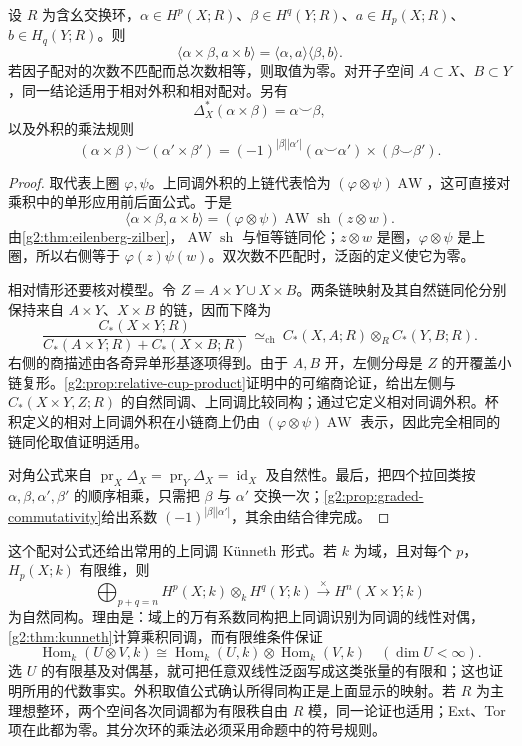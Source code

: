 \begin{proposition}\label{g2:prop:cross-cup-evaluation}
	设 \(R\) 为含幺交换环，\(\alpha\in H^p(X;R)\)、\(\beta\in H^q(Y;R)\)、\(a\in H_p(X;R)\)、\(b\in H_q(Y;R)\)。则
	\[
		\langle\alpha\times\beta,a\times b\rangle
		=\langle\alpha,a\rangle\langle\beta,b\rangle.
	\]
	若因子配对的次数不匹配而总次数相等，则取值为零。对开子空间 \(A\subset X\)、\(B\subset Y\)，同一结论适用于相对外积和相对配对。另有
	\[
		\Delta_X^*(\alpha\times\beta)=\alpha\smile\beta,
	\]
	以及外积的乘法规则
	\[
		(\alpha\times\beta)\smile(\alpha'\times\beta')
		=(-1)^{|\beta||\alpha'|}
			(\alpha\smile\alpha')\times(\beta\smile\beta').
	\]
\end{proposition}
\begin{proof}
	取代表上圈 \(\varphi,\psi\)。上同调外积的上链代表恰为 \((\varphi\otimes\psi)\operatorname{AW}\)，这可直接对乘积中的单形应用前后面公式。于是
	\[
		\langle\alpha\times\beta,a\times b\rangle
		=(\varphi\otimes\psi)\operatorname{AW}\operatorname{sh}(z\otimes w).
	\]
	由\cref{g2:thm:eilenberg-zilber}，\(\operatorname{AW}\operatorname{sh}\) 与恒等链同伦；\(z\otimes w\) 是圈，\(\varphi\otimes\psi\) 是上圈，所以右侧等于 \(\varphi(z)\psi(w)\)。双次数不匹配时，泛函的定义使它为零。

	相对情形还要核对模型。令 \(Z=A\times Y\cup X\times B\)。两条链映射及其自然链同伦分别保持来自 \(A\times Y\)、\(X\times B\) 的链，因而下降为
	\[
		\frac{C_*(X\times Y;R)}{C_*(A\times Y;R)+C_*(X\times B;R)}
		\ \simeq_{\mathrm{ch}}\
		C_*(X,A;R)\otimes_R C_*(Y,B;R).
	\]
	右侧的商描述由各奇异单形基逐项得到。由于 \(A,B\) 开，左侧分母是 \(Z\) 的开覆盖小链复形。\cref{g2:prop:relative-cup-product}证明中的可缩商论证，给出左侧与 \(C_*(X\times Y,Z;R)\) 的自然同调、上同调比较同构；通过它定义相对同调外积。杯积定义的相对上同调外积在小链商上仍由 \((\varphi\otimes\psi)\operatorname{AW}\) 表示，因此完全相同的链同伦取值证明适用。

	对角公式来自 \(\operatorname{pr}_X\Delta_X=\operatorname{pr}_Y\Delta_X=\operatorname{id}_X\) 及自然性。最后，把四个拉回类按 \(\alpha,\beta,\alpha',\beta'\) 的顺序相乘，只需把 \(\beta\) 与 \(\alpha'\) 交换一次；\cref{g2:prop:graded-commutativity}给出系数 \((-1)^{|\beta||\alpha'|}\)，其余由结合律完成。
\end{proof}

这个配对公式还给出常用的上同调 Künneth 形式。若 \(k\) 为域，且对每个 \(p\)，\(H_p(X;k)\) 有限维，则
\[
	\bigoplus_{p+q=n}H^p(X;k)\otimes_k H^q(Y;k)
	\xrightarrow{\ \times\ }H^n(X\times Y;k)
\]
为自然同构。理由是：域上的万有系数同构把上同调识别为同调的线性对偶，\cref{g2:thm:kunneth}计算乘积同调，而有限维条件保证
\[
	\operatorname{Hom}_k(U\otimes V,k)
	\cong\operatorname{Hom}_k(U,k)\otimes\operatorname{Hom}_k(V,k)
	\quad(\dim U<\infty).
\]
选 \(U\) 的有限基及对偶基，就可把任意双线性泛函写成这类张量的有限和；这也证明所用的代数事实。外积取值公式确认所得同构正是上面显示的映射。若 \(R\) 为主理想整环，两个空间各次同调都为有限秩自由 \(R\) 模，同一论证也适用；Ext、Tor 项在此都为零。其分次环的乘法必须采用命题中的符号规则。

